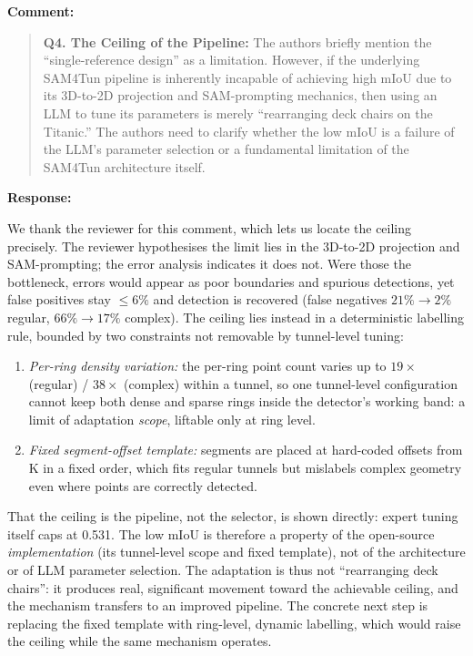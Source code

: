 \documentclass[11pt,a4paper]{article}
\newenvironment{commentblock}{%
  \par\smallskip\noindent\textbf{Comment:}\par
  \begin{quote}\itshape\color{black}
}{%
  \end{quote}\smallskip
}
\newenvironment{responseblock}{%
  \par\smallskip\noindent\textbf{Response:}\par
  \begingroup\color{responsegreen}
}{%
  \endgroup\smallskip
}
\begin{document}
\begin{commentblock}
\textbf{Q4. The Ceiling of the Pipeline:} The authors briefly mention the ``single-reference design'' as a limitation. However, if the underlying SAM4Tun pipeline is inherently incapable of achieving high mIoU due to its 3D-to-2D projection and SAM-prompting mechanics, then using an LLM to tune its parameters is merely ``rearranging deck chairs on the Titanic.'' The authors need to clarify whether the low mIoU is a failure of the LLM's parameter selection or a fundamental limitation of the SAM4Tun architecture itself.
\end{commentblock}
\begin{responseblock}
We thank the reviewer for this comment, which lets us locate the ceiling precisely. The reviewer hypothesises the limit lies in the 3D-to-2D projection and SAM-prompting; the error analysis indicates it does not. Were those the bottleneck, errors would appear as poor boundaries and spurious detections, yet false positives stay $\leq 6\%$ and detection is recovered (false negatives $21\% \rightarrow 2\%$ regular, $66\% \rightarrow 17\%$ complex). The ceiling lies instead in a deterministic labelling rule, bounded by two constraints not removable by tunnel-level tuning:
\begin{enumerate}
\item \emph{Per-ring density variation:} the per-ring point count varies up to $19\times$ (regular) / $38\times$ (complex) within a tunnel, so one tunnel-level configuration cannot keep both dense and sparse rings inside the detector's working band: a limit of adaptation \emph{scope}, liftable only at ring level.
\item \emph{Fixed segment-offset template:} segments are placed at hard-coded offsets from K in a fixed order, which fits regular tunnels but mislabels complex geometry even where points are correctly detected.
\end{enumerate}
That the ceiling is the pipeline, not the selector, is shown directly: expert tuning itself caps at 0.531. The low mIoU is therefore a property of the open-source \emph{implementation} (its tunnel-level scope and fixed template), not of the architecture or of LLM parameter selection. The adaptation is thus not ``rearranging deck chairs'': it produces real, significant movement toward the achievable ceiling, and the mechanism transfers to an improved pipeline. The concrete next step is replacing the fixed template with ring-level, dynamic labelling, which would raise the ceiling while the same mechanism operates.

\end{responseblock}
\end{document}
